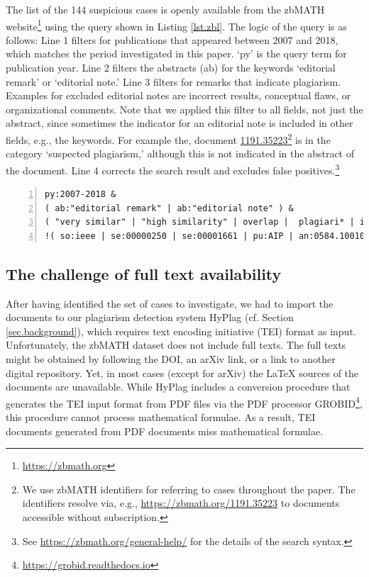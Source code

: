 \documentclass{llncs}
\newcommand{\zbl}[1]{\href{https://zbmath.org/?q=an:#1}{\textsf{#1}}}
\newcommand{\queryLink}{\href{https://zbmath.org/?q=py\%3A2007-2018+\%26+\%28+ab\%3A\%22editorial+remark\%22+\%7C+ab\%3A\%22editorial+note\%22+\%29+\%26++\%28+\%22very+similar\%22+\%7C+\%22high+similarity\%22+\%7C+overlap+\%7C++plagiari*+\%7C+identical+\%7C+substantial*+\%7C+essentially+\%29+\%21\%28+so\%3Aieee+\%7C+se\%3A00000250+\%7C+se\%3A00001661+\%7C+pu\%3AAIP+\%7C+++an\%3A0584.10010+\%7C+an\%3A0712.35001+\%7C+an\%3A0597.14041+\%7C+an\%3A1375.14126+\%7C+an\%3A0156.05104+\%7C+an\%3A1345.15011+\%7C+an\%3A1262.11083\%29}{Click here to execute the query. Subscription required for full display!}}
\begin{document}
The list of the 144 suspicious cases is openly available from the zbMATH website\footnote{\url{https://zbmath.org}} using the query shown in Listing \ref{lst.zbl}. The logic of the query is as follows: Line 1 filters for publications that appeared between 2007 and 2018, which matches the period investigated in this paper. `py' is the query term for publication year.
Line 2 filters the abstracts (ab) for the keywords `editorial remark' or `editorial note.'
Line 3 filters for remarks that indicate plagiarism. Examples for excluded editorial notes are incorrect results, conceptual flaws, or organizational comments. Note that we applied this filter to all fields, not just the abstract, since sometimes the indicator for an editorial note is included in other fields, e.g., the keywords.
For example the, document \zbl{1191.35223}\footnote{We use zbMATH identifiers for referring to cases throughout the paper. The identifiers resolve via, e.g., \url{https://zbmath.org/1191.35223}  to documents accessible without subscription.} is in the category `suspected plagiarism,' although this is not indicated in the abstract of the document.
Line 4 corrects the search result and excludes false positives.\footnote{See \url{https://zbmath.org/general-help/} for the details of the search syntax.}

\begin{lstlisting}[breaklines=true, breakatwhitespace=true, label=lst.zbl, numbers=left,float=t,caption=zbMATH search query to retrieve papers with a noticeable amount of content reuse. \queryLink ]
py:2007-2018 &
( ab:"editorial remark" | ab:"editorial note" ) &
( "very similar" | "high similarity" | overlap |  plagiari* | identical | substantial* | essentially )
!( so:ieee | se:00000250 | se:00001661 | pu:AIP | an:0584.10010 | an:0712.35001 | an:0597.14041 | an:1375.14126 | an:0156.05104 | an:1345.15011 | an:1262.11083)
\end{lstlisting}

\subsection{The challenge of full text availability}\label{sc.Ppf2Tei}

After having identified the set of cases to investigate, we had to import the documents to our plagiarism detection system HyPlag (cf. Section \ref{sec.background}), which requires text encoding initiative (TEI) format as input. Unfortunately, the zbMATH dataset does not include full texts. The full texts might be obtained by following the DOI, an arXiv link, or a link to another digital repository. Yet, in most cases (except for arXiv) the LaTeX sources of the documents are unavailable. While HyPlag includes a conversion procedure that generates the TEI input format from PDF files via the PDF processor GROBID\footnote{\url{https://grobid.readthedocs.io}}, this procedure cannot process mathematical formulae. As a result, TEI documents generated from PDF documents miss mathematical formulae.
\end{document}
